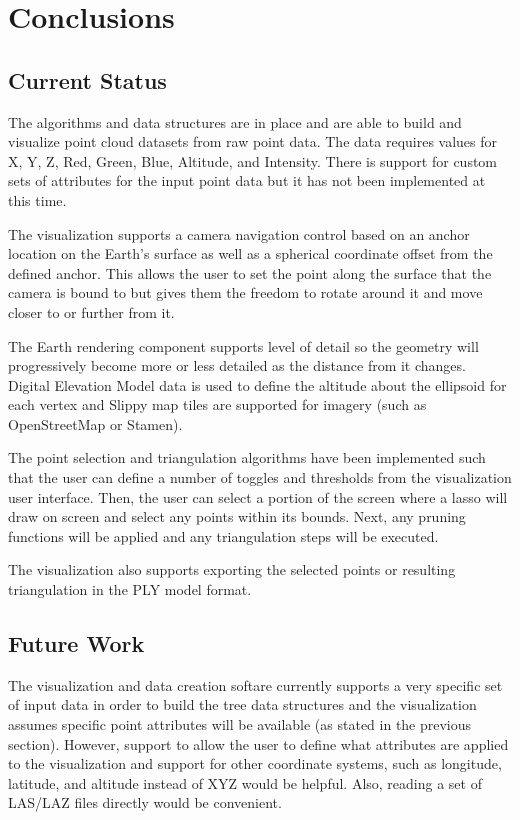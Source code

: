 \chapter{Conclusions}

\section{Current Status}

The algorithms and data structures are in place and are able to build and
visualize point cloud datasets from raw point data. The data requires values for
X, Y, Z, Red, Green, Blue, Altitude, and Intensity. There is support for custom
sets of attributes for the input point data but it has not been implemented at
this time.

The visualization supports a camera navigation control based on an anchor
location on the Earth's surface as well as a spherical coordinate offset from
the defined anchor. This allows the user to set the point along the surface that
the camera is bound to but gives them the freedom to rotate around it and move
closer to or further from it.

The Earth rendering component supports level of detail so the geometry will
progressively become more or less detailed as the distance from it changes.
Digital Elevation Model data is used to define the altitude about the ellipsoid
for each vertex and Slippy map tiles are supported for imagery (such as
OpenStreetMap or Stamen).

The point selection and triangulation algorithms have been implemented such that
the user can define a number of toggles and thresholds from the visualization
user interface. Then, the user can select a portion of the screen where a lasso
will draw on screen and select any points within its bounds. Next, any pruning
functions will be applied and any triangulation steps will be executed.

The visualization also supports exporting the selected points or resulting
triangulation in the PLY model format.

\section{Future Work}

The visualization and data creation softare currently supports a very specific
set of input data in order to build the tree data structures and the
visualization assumes specific point attributes will be available (as stated in
the previous section). However, support to allow the user to define what
attributes are applied to the visualization and support for other coordinate
systems, such as longitude, latitude, and altitude instead of XYZ would be
helpful. Also, reading a set of LAS/LAZ files directly would be convenient.

